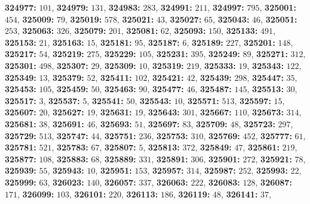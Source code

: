 \textsf{\bfseries 324977:} $101$, \textsf{\bfseries 324979:} $131$, \textsf{\bfseries 324983:} $283$, \textsf{\bfseries 324991:} $211$, \textsf{\bfseries 324997:} $795$, \textsf{\bfseries 325001:} $454$, \textsf{\bfseries 325009:} $79$, \textsf{\bfseries 325019:} $578$, \textsf{\bfseries 325021:} $43$, \textsf{\bfseries 325027:} $65$, \textsf{\bfseries 325043:} $46$, \textsf{\bfseries 325051:} $253$, \textsf{\bfseries 325063:} $326$, \textsf{\bfseries 325079:} $201$, \textsf{\bfseries 325081:} $62$, \textsf{\bfseries 325093:} $150$, \textsf{\bfseries 325133:} $491$, \textsf{\bfseries 325153:} $21$, \textsf{\bfseries 325163:} $15$, \textsf{\bfseries 325181:} $95$, \textsf{\bfseries 325187:} $6$, \textsf{\bfseries 325189:} $227$, \textsf{\bfseries 325201:} $148$, \textsf{\bfseries 325217:} $54$, \textsf{\bfseries 325219:} $275$, \textsf{\bfseries 325229:} $105$, \textsf{\bfseries 325231:} $395$, \textsf{\bfseries 325249:} $89$, \textsf{\bfseries 325271:} $312$, \textsf{\bfseries 325301:} $498$, \textsf{\bfseries 325307:} $29$, \textsf{\bfseries 325309:} $10$, \textsf{\bfseries 325319:} $219$, \textsf{\bfseries 325333:} $19$, \textsf{\bfseries 325343:} $122$, \textsf{\bfseries 325349:} $13$, \textsf{\bfseries 325379:} $52$, \textsf{\bfseries 325411:} $102$, \textsf{\bfseries 325421:} $42$, \textsf{\bfseries 325439:} $298$, \textsf{\bfseries 325447:} $35$, \textsf{\bfseries 325453:} $105$, \textsf{\bfseries 325459:} $50$, \textsf{\bfseries 325463:} $90$, \textsf{\bfseries 325477:} $46$, \textsf{\bfseries 325487:} $145$, \textsf{\bfseries 325513:} $30$, \textsf{\bfseries 325517:} $3$, \textsf{\bfseries 325537:} $5$, \textsf{\bfseries 325541:} $50$, \textsf{\bfseries 325543:} $10$, \textsf{\bfseries 325571:} $513$, \textsf{\bfseries 325597:} $15$, \textsf{\bfseries 325607:} $20$, \textsf{\bfseries 325627:} $19$, \textsf{\bfseries 325631:} $19$, \textsf{\bfseries 325643:} $301$, \textsf{\bfseries 325667:} $110$, \textsf{\bfseries 325673:} $314$, \textsf{\bfseries 325681:} $38$, \textsf{\bfseries 325691:} $46$, \textsf{\bfseries 325693:} $51$, \textsf{\bfseries 325697:} $83$, \textsf{\bfseries 325709:} $48$, \textsf{\bfseries 325723:} $297$, \textsf{\bfseries 325729:} $513$, \textsf{\bfseries 325747:} $44$, \textsf{\bfseries 325751:} $236$, \textsf{\bfseries 325753:} $310$, \textsf{\bfseries 325769:} $452$, \textsf{\bfseries 325777:} $61$, \textsf{\bfseries 325781:} $521$, \textsf{\bfseries 325783:} $67$, \textsf{\bfseries 325807:} $5$, \textsf{\bfseries 325813:} $372$, \textsf{\bfseries 325849:} $47$, \textsf{\bfseries 325861:} $219$, \textsf{\bfseries 325877:} $108$, \textsf{\bfseries 325883:} $68$, \textsf{\bfseries 325889:} $331$, \textsf{\bfseries 325891:} $306$, \textsf{\bfseries 325901:} $272$, \textsf{\bfseries 325921:} $78$, \textsf{\bfseries 325939:} $55$, \textsf{\bfseries 325943:} $10$, \textsf{\bfseries 325951:} $153$, \textsf{\bfseries 325957:} $314$, \textsf{\bfseries 325987:} $252$, \textsf{\bfseries 325993:} $22$, \textsf{\bfseries 325999:} $63$, \textsf{\bfseries 326023:} $140$, \textsf{\bfseries 326057:} $337$, \textsf{\bfseries 326063:} $222$, \textsf{\bfseries 326083:} $128$, \textsf{\bfseries 326087:} $171$, \textsf{\bfseries 326099:} $103$, \textsf{\bfseries 326101:} $220$, \textsf{\bfseries 326113:} $186$, \textsf{\bfseries 326119:} $48$, \textsf{\bfseries 326141:} $37$, 
